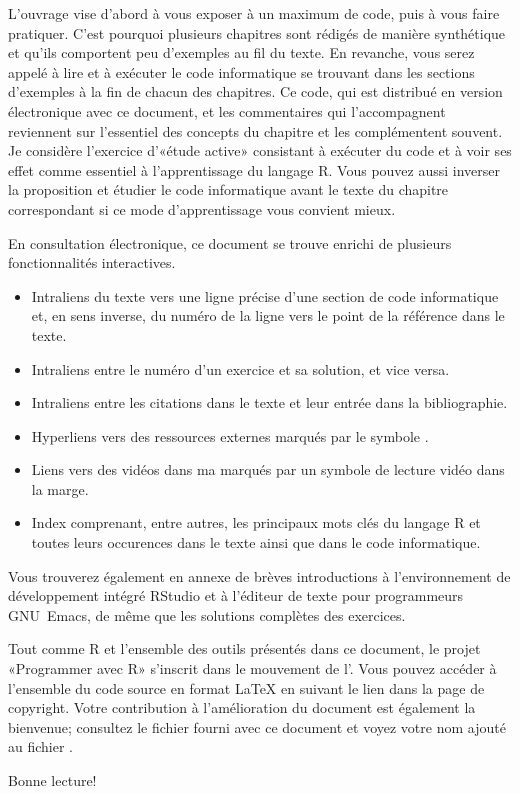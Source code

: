 L'ouvrage vise d'abord à vous exposer à un maximum de code, puis à
vous faire pratiquer. C'est pourquoi plusieurs chapitres sont rédigés
de manière synthétique et qu'ils comportent peu d'exemples au fil du
texte. En revanche, vous serez appelé à lire et à exécuter le code
informatique se trouvant dans les sections d'exemples à la fin de
chacun des chapitres. Ce code, qui est distribué en version
électronique avec ce document, et les commentaires qui l'accompagnent
reviennent sur l'essentiel des concepts du chapitre et les
complémentent souvent. Je considère l'exercice d'«étude active»
consistant à exécuter du code et à voir ses effet comme essentiel à
l'apprentissage du langage R. Vous pouvez aussi inverser la
proposition et étudier le code informatique avant le texte du chapitre
correspondant si ce mode d'apprentissage vous convient mieux.

En consultation électronique, ce document se trouve enrichi de
plusieurs fonctionnalités interactives.
\begin{itemize}
\item Intraliens du texte vers une ligne précise d'une section de code
  informatique et, en sens inverse, du numéro de la ligne vers le
  point de la référence dans le texte.
\item Intraliens entre le numéro d'un exercice et sa solution, et vice
  versa.
\item Intraliens entre les citations dans le texte et leur entrée dans
  la bibliographie.
\item Hyperliens vers des ressources externes marqués par le symbole
  {\smaller\faExternalLink}.
\item Liens vers des vidéos dans ma %
  marqués par un symbole de lecture vidéo {\smaller\faYoutubePlay} dans la
  marge.
\item Index comprenant, entre autres, les principaux mots clés du
  langage R et toutes leurs occurences dans le texte ainsi que
  dans le code informatique.
\end{itemize}

Vous trouverez également en annexe de brèves introductions à
l'environnement de développement intégré RStudio et à l'éditeur de
texte pour programmeurs GNU~Emacs, de même que les solutions complètes
des exercices.

Tout comme R et l'ensemble des outils présentés dans ce document, le
projet «Programmer avec R» s'inscrit dans le mouvement de
l'. Vous pouvez accéder à l'ensemble du code source en format
{\LaTeX} en suivant le lien dans la page de copyright. Votre
contribution à l'amélioration du document est également la bienvenue;
consultez le fichier  fourni avec ce document
et voyez votre nom ajouté au fichier .

Bonne lecture!

